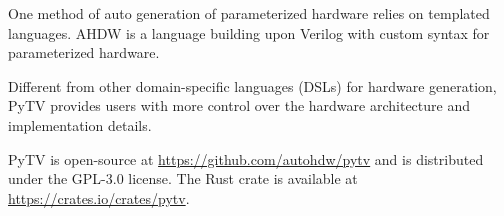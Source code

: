 One method of auto generation of parameterized hardware relies on templated languages.
AHDW \cite{zhao2023automatic} is a language building upon Verilog with custom syntax for parameterized hardware.

Different from other domain-specific languages (DSLs) for hardware generation,
PyTV provides users with more control over the hardware architecture and implementation details.

PyTV is open-source at \url{https://github.com/autohdw/pytv}
and is distributed under the GPL-3.0 license.
The Rust crate is available at \url{https://crates.io/crates/pytv}.
